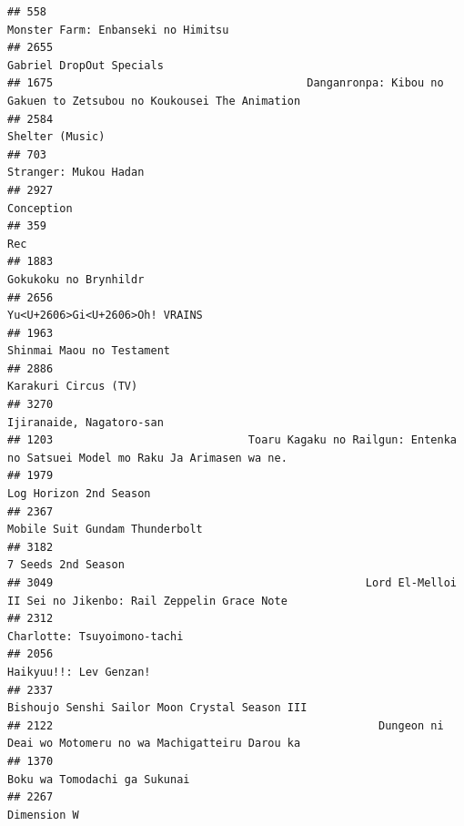 \documentclass[
]{article}
\begin{document}
\begin{verbatim}
## 558                                                                         Monster Farm: Enbanseki no Himitsu
## 2655                                                                                  Gabriel DropOut Specials
## 1675                                       Danganronpa: Kibou no Gakuen to Zetsubou no Koukousei The Animation
## 2584                                                                                           Shelter (Music)
## 703                                                                                      Stranger: Mukou Hadan
## 2927                                                                                                Conception
## 359                                                                                                        Rec
## 1883                                                                                     Gokukoku no Brynhildr
## 2656                                                                            Yu<U+2606>Gi<U+2606>Oh! VRAINS
## 1963                                                                                 Shinmai Maou no Testament
## 2886                                                                                      Karakuri Circus (TV)
## 3270                                                                                  Ijiranaide, Nagatoro-san
## 1203                              Toaru Kagaku no Railgun: Entenka no Satsuei Model mo Raku Ja Arimasen wa ne.
## 1979                                                                                    Log Horizon 2nd Season
## 2367                                                                            Mobile Suit Gundam Thunderbolt
## 3182                                                                                        7 Seeds 2nd Season
## 3049                                                Lord El-Melloi II Sei no Jikenbo: Rail Zeppelin Grace Note
## 2312                                                                               Charlotte: Tsuyoimono-tachi
## 2056                                                                                    Haikyuu!!: Lev Genzan!
## 2337                                                            Bishoujo Senshi Sailor Moon Crystal Season III
## 2122                                                  Dungeon ni Deai wo Motomeru no wa Machigatteiru Darou ka
## 1370                                                                              Boku wa Tomodachi ga Sukunai
## 2267                                                                                               Dimension W

\end{verbatim}
\end{document}
